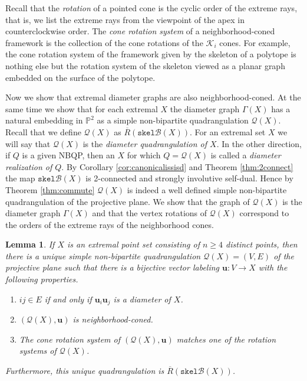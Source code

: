 \documentclass{article}
\newtheorem{lemma}[theorem]{Lemma}
\newcounter{example}
\newcommand{\vu}[0]{\mathbf{u}}
\newcommand{\Pb}[0]{\mathbb{P}}
\newcommand{\Kc}[0]{\mathcal{K}}
\newcommand{\Bc}[0]{\mathcal{B}}
\newcommand{\skel}[0]{\mathtt{skel}}
\newcommand{\qt}{\mathcal{Q}}
\begin{document}
Recall that the \emph{rotation} of a pointed cone is the cyclic order of the extreme rays, that is, we list the extreme rays from the viewpoint of the apex in counterclockwise order. The \emph{cone rotation system} of a neighborhood-coned framework is the collection of the cone rotations of the $\Kc_i$ cones. For example, the cone rotation system of the framework given by the skeleton of a polytope is nothing else but the rotation system of the skeleton viewed as a planar graph embedded on the surface of the polytope.

Now we show that extremal diameter graphs are also neighborhood-coned. At the same time we show that for each extremal $X$ the diameter graph $\Gamma(X)$ has a natural embedding in  $\Pb^2$ as a simple non-bipartite quadrangulation $\qt(X)$. Recall that we define $\qt(X)$ as $\overline R(\skel\Bc(X))$. For an extremal set $X$ we will say that $\qt(X)$ is the \emph{diameter quadrangulation of $X$}.  In the other direction, if $Q$ is a given NBQP, then an $X$ for which $Q=\qt(X)$ is called a \emph{diameter realization of $Q$}. By Corollary \ref{cor:canonicalissisd} and Theorem \ref{thm:2connect} the map $\skel\Bc(X)$ is 2-connected and strongly involutive self-dual. Hence by Theorem \ref{thm:commute} $\qt(X)$ is indeed a well defined simple non-bipartite quadrangulation of the projective plane. We show that the graph of $\qt(X)$ is the diameter graph $\Gamma(X)$ and that the vertex rotations of $\qt(X)$ correspond to the orders of the extreme rays of the neighborhood cones. 

\begin{lemma}\label{lem:diameterispolyhedral}
    If $X$ is an extremal point set consisting of $n\ge 4$ distinct points, then there is a unique simple non-bipartite quadrangulation $\qt(X)=(V,E)$ of the projective plane such that there is a bijective vector labeling $\vu:V\rightarrow X$ with the following properties. 
    \begin{enumerate}[label=\alph*)]
    \item $ij\in E$ if and only if $\vu_i\vu_j$ is a diameter of $X$.
    \item $(\qt(X),\vu)$ is neighborhood-coned.
   \item The cone rotation system of $(\qt(X),\vu)$ matches one of the rotation systems of $\qt(X)$.
    \end{enumerate}
Furthermore, this unique quadrangulation is $\overline{R}(\skel\Bc(X))$.
    
\end{lemma}
\end{document}
